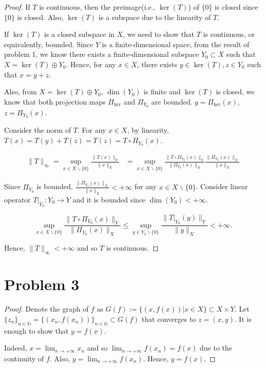 \documentclass[12pt]{article}
\begin{document}
\begin{proof}

If $T$ is continuous, then the preimage(i.e., $\ker(T)$) of $\{0\}$ is closed since $\{0\}$ is closed. Also, $\ker(T)$ is a subspace due to the linearity of $T$.

If $\ker(T)$ is a closed subspace in $X$, we need to show that $T$ is continuous, or equivalently, bounded. Since $Y$ is a finite-dimensional space, from the result of problem 1, we know there exists a finite-dimensional subspace $Y_0\subset X$ such that $X = \ker(T)\oplus Y_0 $. Hence, for any $x\in X$, there exists $y\in \ker(T), z\in Y_0$ such that $x = y + z$. 

Also, from $X = \ker(T)\oplus Y_0 $, $\dim (Y_0)$ is finite and $\ker(T)$ is closed, we know that both projection maps $\Pi_{\ker}$ and $\Pi_{Y_0}$ are bounded. $y = \Pi_{\ker}(x)$, $z = \Pi_{Y_0}(x)$.

Consider the norm of $T$. For any $x\in X$, by linearity, $T(x) = T(y) + T(z) = T(z) = T\circ \Pi_{Y_0}(x)$.

$$
\begin{aligned}
\|T\|_\infty = \sup_{x\in X\backslash \{0\}}\frac{\|T(x)\|_Y}{\|x\|_X} & =  \sup_{x\in X\backslash \{0\}}\frac{\|T\circ \Pi_{Y_0}(x)\|_Y}{\|\Pi_{Y_0}(x)\|_X} \frac{\|\Pi_{Y_0}(x)\|_X}{\|x\|_X} 
\end{aligned}
$$

Since $\Pi_{Y_0}$ is bounded, $\frac{\|\Pi_{Y_0}(x)\|_X}{\|x\|_X}<+\infty$ for any $x\in X\backslash\{0\}$. Consider linear operator $T|_{Y_0}: Y_0 \rightarrow Y $ and it is bounded since $\dim(Y_0)<+\infty$. 

$$
\sup_{x\in X\backslash \{0\}}\frac{\|T\circ \Pi_{Y_0}(x)\|_Y}{\|\Pi_{Y_0}(x)\|_X} \leqslant \sup_{y\in Y_0\backslash \{0\}}\frac{\|T|_{Y_0}(y)\|_Y}{\|y\|_X} < +\infty.
$$

Hence, $\|T\|_\infty < +\infty$ and so $T$ is continuous.

\end{proof}

\section*{Problem 3}

\begin{proof}

Denote the graph of $f$ as $G(f):= \{ (x, f(x)) | x\in X \} \subset X\times Y$. Let $\{z_n\}_{n\in\mathbb N} = \{ (x_n, f(x_n)) \}_{n\in\mathbb N} \subset G(f)$ that converges to $z = (x, y)$. It is enough to show that $y = f(x)$.

Indeed, $x = \lim_{n\rightarrow +\infty} x_n$ and so $\lim_{n\rightarrow +\infty} f(x_n) = f(x)$ due to the continuity of $f$. Also, $y = \lim_{n\rightarrow +\infty} f(x_n)$. Hence, $y = f(x)$.

\end{proof}
\end{document}
